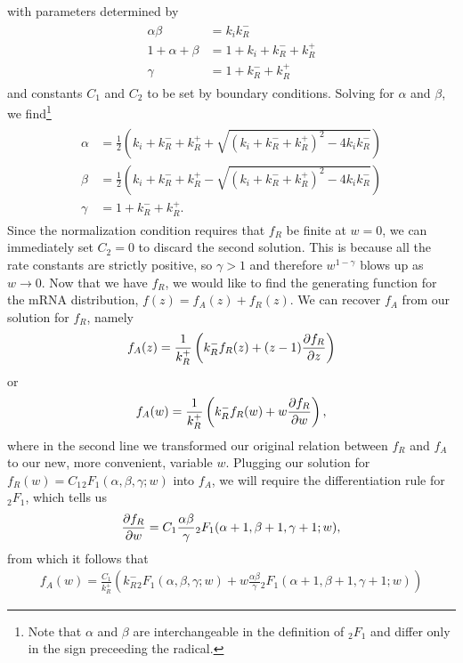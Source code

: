with parameters determined by
\begin{align}
\begin{split}
\alpha\beta &= k_i k_R^-
\\
1+\alpha+\beta &= 1+k_i+k_R^-+k_R^+
\\
\gamma &= 1 + k_R^- + k_R^+
\end{split}
\end{align}
and constants $C_1$ and $C_2$ to be set by boundary conditions.
Solving for $\alpha$ and $\beta$, we find\footnote{
Note that $\alpha$ and $\beta$ are interchangeable in the definition of
${_2F_1}$ and differ only in the sign preceeding the radical.
}
\begin{align}
\begin{split}
\alpha &= \frac{1}{2}
\left(k_i+k_R^-+k_R^+ + \sqrt{(k_i+k_R^-+k_R^+)^2 - 4k_i k_R^-}\right)
\\
\beta &= \frac{1}{2}
\left(k_i+k_R^-+k_R^+ - \sqrt{(k_i+k_R^-+k_R^+)^2 - 4k_i k_R^-}\right)
\\
\gamma &= 1 + k_R^- + k_R^+.
\end{split}
\end{align}
Since the normalization condition requires that $f_R$ be finite at $w=0$,
we can immediately set $C_2=0$ to discard the second solution.
This is because all the rate constants are strictly positive,
so $\gamma>1$ and therefore $w^{1-\gamma}$ blows up as $w\rightarrow0$.
Now that we have $f_R$, we would like to find the generating function
for the mRNA distribution, $f(z) = f_A(z) + f_R(z)$.
We can recover $f_A$ from our solution for $f_R$, namely
\begin{align}
f_A(z) = \frac{1}{k_R^+}\left(k_R^- f_R(z) + (z-1) \pderiv[f_R]{z}\right)
\end{align}
or
\begin{align}
f_A(w) = \frac{1}{k_R^+}\left(k_R^- f_R(w) + w \pderiv[f_R]{w}\right),
\end{align}
where in the second line we transformed our original relation between
$f_R$ and $f_A$ to our new, more convenient, variable $w$.
Plugging our solution for $f_R(w) = C_1{_2F_1}(\alpha, \beta, \gamma; w)$
into $f_A$, we will require the differentiation rule for ${_2F_1}$,
which tells us
\begin{align}
\pderiv[f_R]{w} = C_1\frac{\alpha\beta}{\gamma}
                {_2F_1}(\alpha+1, \beta+1, \gamma+1; w),
\end{align}
from which it follows that
\begin{align}
f_A(w) = \frac{C_1}{k_R^+}
\left(
k_R^- {_2F_1}(\alpha, \beta, \gamma; w)
+ w\frac{\alpha\beta}{\gamma} {_2F_1}(\alpha+1, \beta+1, \gamma+1; w)
\right)
\end{align}
